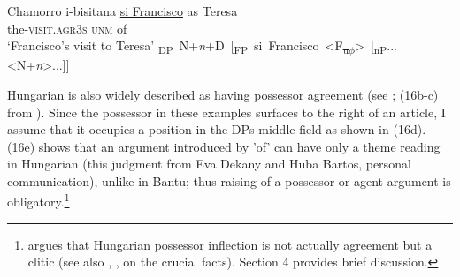 \documentclass[output=paper
,modfonts
,nonflat]{langsci/langscibook}
\begin{document}
\begin{exe}
	\ex Chamorro
	\xlist
	\ex 
	\gll i-bisitana       \underline{si Francisco}   as Teresa \\
	the-\textsc{visit.agr3s}     \textsc{unm}            of\\
	\glt `Francisco's visit to Teresa'  	
	\ex \mbox{{\lbrack}\textsubscript{DP} N+\textit{n}+D [\textsubscript{FP} si Francisco  <F\textsubscript{\sout{u}}\textsubscript{\sout{$\phi$}}> [\textsubscript{nP}...<N+\textit{n}>...]]{\rbrack}}
	\endxlist
\end{exe}
Hungarian is also widely described as having possessor agreement (see \citealt{Szabolcsi1983, Szabolcsi1994};  (16b-c) from \citealt[139]{Den_Dikken1999}). Since the possessor in these examples surfaces to the right of an article, I assume that it occupies a position in the DPs middle field as shown in (16d). (16e) shows that an argument introduced by 'of' can have only a theme reading in Hungarian (this judgment from Eva Dekany and Huba Bartos, personal communication), unlike in Bantu; thus raising of a possessor or agent argument is obligatory.\footnote{\citet{Den_Dikken2015} argues that Hungarian possessor inflection is not actually agreement but a clitic (see also \citealt{Den_Dikken1999}, \citealt{Bartos1999}, \citealt{Kiss2002} on the crucial facts). Section 4 provides brief discussion.} 
\end{document}
